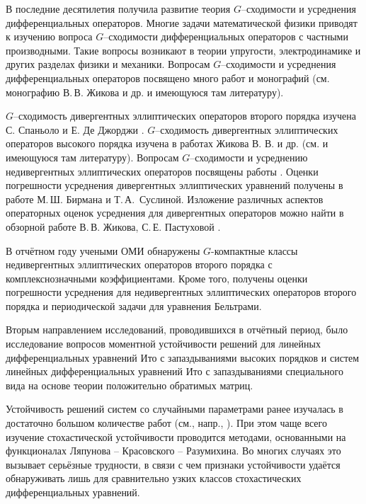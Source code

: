 \Introduction




В последние десятилетия получила развитие теория $G$--сходимости и усреднения дифференциальных
операторов. Многие задачи математической
физики приводят к изучению вопроса $G$--сходимости дифференциальных
операторов с частными производными. Такие вопросы возникают в теории упругости,
электродинамике и других разделах физики и механики. Вопросам
$G$--сходимости и усреднения дифференциальных
операторов посвящено много работ и монографий (см. монографию В.\,В. Жикова и др.
\cite{smm_ZhKO} и имеющуюся там литературу).

$G$--сходимость дивергентных эллиптических операторов второго порядка изучена
С. Спаньоло и Е. Де Джорджи \cite{smm_Dg1, smm_Dg2, smm_Dg3}.
$G$--сходимость дивергентных эллиптических операторов высокого порядка изучена в
работах Жикова В. В. и др. (см. \cite{smm_ZhKO} и имеющуюся там литературу).
Вопросам $G$--сходимости и усреднению недивергентных эллиптических операторов
посвящены работы \cite{smm_ZhS, smm_ZhS1, smm_Sir1, smm_Sir}.
Оценки погрешности усреднения  дивергентных эллиптических уравнений  получены в работе  \cite{smm_Sus} М.\,Ш. Бирмана и
  Т.\,А.~Суслиной.
Изложение различных аспектов операторных оценок усреднения для дивергентных
операторов можно найти в обзорной работе В.\,В. Жикова,
С.\,Е. Пастуховой  \cite{smm_VP}.

В отчётном году учеными ОМИ обнаружены $G$-компактные классы недивергентных эллиптических операторов второго порядка с комплекснозначными коэффициентами.
Кроме того, получены оценки погрешности усреднения для недивергентных
эллиптических операторов второго порядка и периодической задачи для уравнения Бельтрами.



Вторым направлением исследований, проводившихся в отчётный период, было исследование вопросов моментной устойчивости решений для линейных дифференциальных уравнений Ито с запаздываниями высоких порядков и систем линейных дифференциальных уравнений Ито с запаздываниями специального вида на основе теории положительно обратимых матриц.

Устойчивость решений систем со случайными параметрами ранее изучалась в достаточно большом количестве работ (см., напр., \cite{kri-bib-1, kri-bib-2, kri-bib-3, kri-bib-4}). При этом чаще всего изучение стохастической устойчивости проводится методами, основанными на функционалах Ляпунова -- Красовского -- Разумихина.
Во многих случаях это вызывает серьёзные трудности, в связи с чем признаки устойчивости удаётся обнаруживать лишь для сравнительно узких классов стохастических дифференциальных уравнений.

